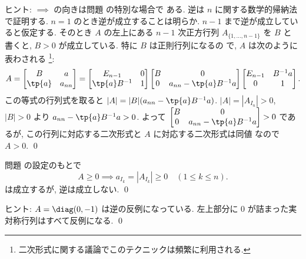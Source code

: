 \documentclass[12pt,twoside]{jarticle}
\begin{document}
\noindent
ヒント: $\implies$ の向きは問題  の特別な場合で
ある.  逆は $n$ に関する数学的帰納法で証明する.  
$n=1$ のとき逆が成立することは明らか.  
$n-1$ まで逆が成立していると仮定する. 
そのとき $A$ の左上にある $n-1$ 次正方行列 $A_{\{1,\dots,n-1\}}$ を $B$ と
書くと, $B>0$ が成立している. 特に $B$ は正則行列になるの
で, $A$ は次のように表わされる%
\footnote{二次形式に関する議論でこのテクニックは頻繁に利用される.}:
\begin{equation*}
  A =
  \begin{bmatrix}
    B      & a      \\
    \tp{a} & a_{nn} \\
  \end{bmatrix}
  =
  \begin{bmatrix}
    E_{n-1}      & 0 \\
    \tp{a}B^{-1} & 1 \\
  \end{bmatrix}
  \begin{bmatrix}
    B & 0 \\
    0 & a_{nn} - \tp{a}B^{-1}a \\
  \end{bmatrix}
  \begin{bmatrix}
    E_{n-1} & B^{-1}a \\
      0     & 1 \\
  \end{bmatrix}.
\end{equation*}
この等式の行列式を取ると $|A|=|B|(a_{nn}-\tp{a}B^{-1}a)$.
$|A|=|A_{I_n}|>0$, $|B|>0$ より $a_{nn}-\tp{a}B^{-1}a>0$.
よって $
  \begin{bmatrix}
    B & 0 \\
    0 & a_{nn} - \tp{a}B^{-1}a \\
  \end{bmatrix}
  > 0
$ であるが, この行列に対応する二次形式と $A$ に対応する二次形式は同値
なので $A>0$.
\qed


\begin{question}
\label{q:criterion-positive-2}
  問題  の設定のもとで
  \begin{equation*}
    A \ge 0 \implies a_{I_k}=|A_{I_k}| \ge 0 \quad(1\le k\le n).
  \end{equation*}
  は成立するが, 逆は成立しない. \qed
\end{question}

\noindent
ヒント: $A=\diag(0,-1)$ は逆の反例になっている.  左上部分に $0$ が詰まった実
対称行列はすべて反例になる.
\qed
\end{document}
